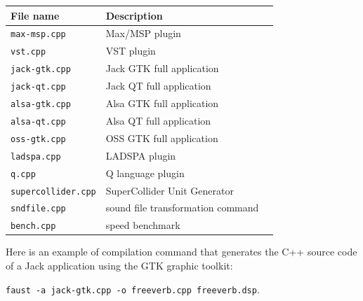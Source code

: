 \documentclass{article}
\begin{document}
\vspace{5 mm}

\begin{tabular}{|l|l|l|}
\hline
\textbf{File name}			& \textbf{Description}   \\
\hline
\texttt{max-msp.cpp} 		& Max/MSP plugin  \\
\texttt{vst.cpp} 			& VST plugin  \\
\texttt{jack-gtk.cpp} 		& Jack GTK full application  \\
\texttt{jack-qt.cpp} 		& Jack QT full application  \\
\texttt{alsa-gtk.cpp} 		& Alsa GTK full application  \\
\texttt{alsa-qt.cpp} 		& Alsa QT full application  \\
\texttt{oss-gtk.cpp} 		& OSS GTK full application  \\
\texttt{ladspa.cpp} 		& LADSPA plugin  \\
\texttt{q.cpp} 				& Q language plugin  \\
\texttt{supercollider.cpp} 	& SuperCollider Unit Generator  \\
\texttt{sndfile.cpp} 		& sound file transformation command \\
\texttt{bench.cpp} 			& speed benchmark   \\

\hline
\end{tabular}

\vspace{5 mm}

Here is an example of compilation command that generates the C++ source code of a Jack application using the GTK graphic toolkit:

\texttt{faust -a jack-gtk.cpp -o freeverb.cpp freeverb.dsp}.

\vspace{5 mm}

\end{document}
